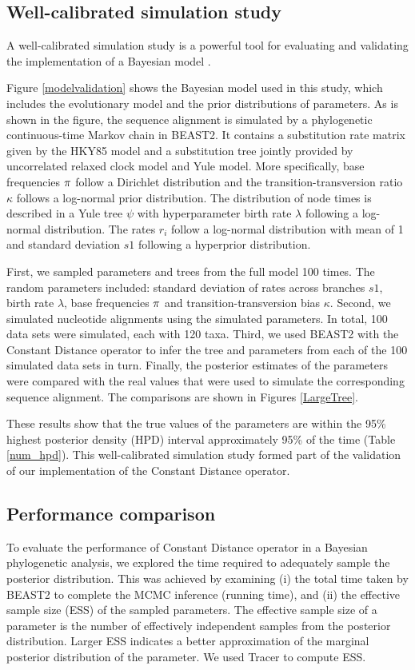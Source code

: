 \documentclass{bmcart}
\begin{document}
\subsection*{Well-calibrated simulation study}
A well-calibrated simulation study is a powerful tool for evaluating and validating the implementation of a Bayesian model \cite{dawid1982well}.

Figure \ref{modelvalidation} shows the Bayesian model used in this study, which includes the evolutionary model and the prior distributions of parameters. As is shown in the figure, the sequence alignment is simulated by a phylogenetic continuous-time Markov chain in BEAST2. It contains a substitution rate matrix given by the HKY85 \cite{hasegawa1985dating} model and a substitution tree jointly provided by uncorrelated relaxed clock model and Yule model. More specifically, base frequencies $\bf{\pi}$ follow a Dirichlet distribution and the transition-transversion ratio $\kappa$ follows a log-normal prior distribution. The distribution of node times is described in a Yule tree $\psi$ with hyperparameter birth rate $\lambda $ following a log-normal distribution. The rates $r_i$ follow a log-normal distribution with mean of 1 and standard deviation $s1$ following a hyperprior distribution.

First, we sampled parameters and trees from the full model 100 times. The random parameters included: standard deviation of rates across branches $s1$, birth rate $\lambda $, base frequencies $\bf{\pi}$ and transition-transversion bias $\kappa$. Second, we simulated nucleotide alignments using the simulated parameters. In total, 100 data sets were simulated, each with 120 taxa. Third, we used BEAST2 with the Constant Distance operator to infer the tree and parameters from each of the 100 simulated data sets in turn. Finally, the posterior estimates of the parameters were compared with the real values that were used to simulate the corresponding sequence alignment. The comparisons are shown in Figures \ref{LargeTree}.

These results show that the true values of the parameters are within the 95\% highest posterior density (HPD) interval approximately 95\% of the time (Table \ref{num_hpd}). This well-calibrated simulation study formed part of the validation of our implementation of the Constant Distance operator.

\subsection*{Performance comparison}
To evaluate the performance of Constant Distance operator in a Bayesian phylogenetic analysis, we explored the time required to adequately sample the posterior distribution. This was achieved by examining (i) the total time taken by BEAST2 to complete the MCMC inference (running time), and (ii) the effective sample size (ESS) of the sampled parameters. The effective sample size of a parameter is the number of effectively independent samples from the posterior distribution. Larger ESS indicates a better approximation of the marginal posterior distribution of the parameter. We used Tracer \cite{Tracer} to compute ESS.
\end{document}
